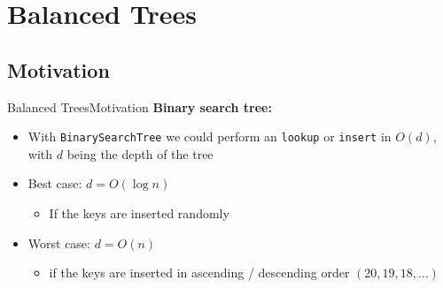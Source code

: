 \section{Balanced Trees}

\subsection{Motivation}

\begin{frame}{Balanced Trees}{Motivation}
  \textbf{Binary search tree:}
  \begin{itemize}
  \item<2->
    With \texttt{\color{Mittel-Blau}BinarySearchTree} we could perform an
    \texttt{\color{Mittel-Blau}lookup} or
    \texttt{\color{Mittel-Blau}insert} in $O(d)$, with $d$ being
    the {\color{Mittel-Blau}depth} of the tree
  \item<3->
    {\color{Mittel-Blau}Best case}: $d = O(\log n)$
    \begin{itemize}
    \item<4-> If the keys are inserted randomly
    \end{itemize}   
  \item<5->
    {\color{Mittel-Blau}Worst case}: $d = O(n)$
    \begin{itemize}
    \item<6->if the keys are inserted in ascending / descending
      order $(20, 19, 18, \dotsc)$
    \end{itemize}  
  \end{itemize}
\end{frame}



